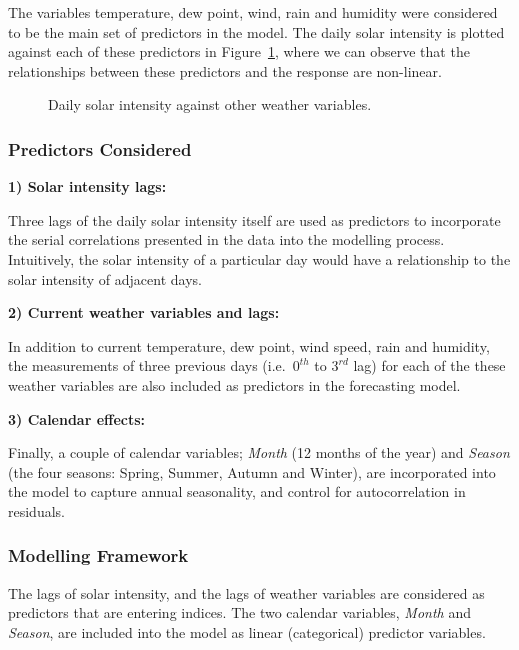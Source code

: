 \documentclass[
  11pt,
  a4paper,
]{article}
\begin{document}
The variables temperature, dew point, wind, rain and humidity were
considered to be the main set of predictors in the model. The daily
solar intensity is plotted against each of these predictors in
Figure~\ref{fig-preds}, where we can observe that the relationships
between these predictors and the response are non-linear.

\begin{figure}


\caption{\label{fig-preds}Daily solar intensity against other weather
variables.}

\end{figure}%

\subsubsection{Predictors Considered}\label{predictors-considered-1}

\textbf{1) Solar intensity lags:}

Three lags of the daily solar intensity itself are used as predictors to
incorporate the serial correlations presented in the data into the
modelling process. Intuitively, the solar intensity of a particular day
would have a relationship to the solar intensity of adjacent days.

\textbf{2) Current weather variables and lags:}

In addition to current temperature, dew point, wind speed, rain and
humidity, the measurements of three previous days (i.e.~\(0^{th}\) to
\(3^{rd}\) lag) for each of the these weather variables are also
included as predictors in the forecasting model.

\textbf{3) Calendar effects:}

Finally, a couple of calendar variables; \emph{Month} (12 months of the
year) and \emph{Season} (the four seasons: Spring, Summer, Autumn and
Winter), are incorporated into the model to capture annual seasonality,
and control for autocorrelation in residuals.

\subsubsection{Modelling Framework}\label{modelling-framework-1}

The lags of solar intensity, and the lags of weather variables are
considered as predictors that are entering indices. The two calendar
variables, \emph{Month} and \emph{Season}, are included into the model
as linear (categorical) predictor variables.
\end{document}
